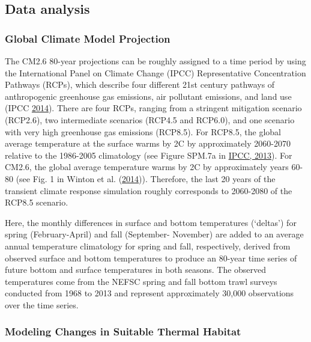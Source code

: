 \documentclass[
]{book}
\begin{document}
\hypertarget{data-analysis-40}{%
\subsection{Data analysis}\label{data-analysis-40}}

\hypertarget{global-climate-model-projection-1}{%
\subsubsection{Global Climate Model Projection}\label{global-climate-model-projection-1}}

The CM2.6 80-year projections can be roughly assigned to a time period by using the International Panel on Climate Change (IPCC) Representative Concentration Pathways (RCPs), which describe four different 21st century pathways of anthropogenic greenhouse gas emissions, air pollutant emissions, and land use (IPCC \protect\hyperlink{ref-IPCC2014}{2014}). There are four RCPs, ranging from a stringent mitigation scenario (RCP2.6), two intermediate scenarios (RCP4.5 and RCP6.0), and one scenario with very high greenhouse gas emissions (RCP8.5). For RCP8.5, the global average temperature at the surface warms by 2C by approximately 2060-2070 relative to the 1986-2005 climatology (see Figure SPM.7a in \href{https://www.ipcc.ch/pdf/assessment-report/ar5/wg1/WG1AR5_SPM_FINAL.pdf}{IPCC, 2013}). For CM2.6, the global average temperature warms by 2C by approximately years 60-80 (see Fig. 1 in Winton et al. (\protect\hyperlink{ref-winton_has_2014}{2014})). Therefore, the last 20 years of the transient climate response simulation roughly corresponds to 2060-2080 of the RCP8.5 scenario.

Here, the monthly differences in surface and bottom temperatures (`deltas') for spring (February-April) and fall (September- November) are added to an average annual temperature climatology for spring and fall, respectively, derived from observed surface and bottom temperatures to produce an 80-year time series of future bottom and surface temperatures in both seasons. The observed temperatures come from the NEFSC spring and fall bottom trawl surveys conducted from 1968 to 2013 and represent approximately 30,000 observations over the time series.

\hypertarget{modeling-changes-in-suitable-thermal-habitat-1}{%
\subsubsection{Modeling Changes in Suitable Thermal Habitat}\label{modeling-changes-in-suitable-thermal-habitat-1}}
\end{document}

